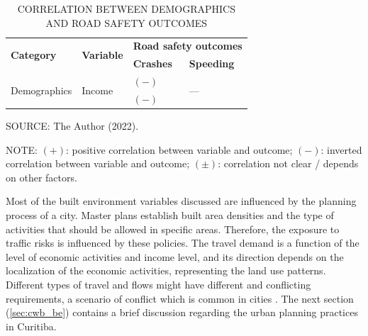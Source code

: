 \begin{table}[!hbtp]
    \footnotesize
    \captionsetup{justification=raggedright,
        singlelinecheck=false,
        font=footnotesize}
    \caption{CORRELATION BETWEEN DEMOGRAPHICS AND ROAD SAFETY OUTCOMES}
    \centering
    \begin{tabular}{llll}
        \hline
        \multirow{2}{*}{\textbf{Category}} & \multirow{2}{*}{\textbf{Variable}} & \multicolumn{2}{c}{\textbf{Road safety outcomes}} \\
         &  & \textbf{Crashes} & \textbf{Speeding} \\ \hline
        \multirow{2}{*}{Demographics} & \multirow{2}{*}{Income} & $(-)$ \textcite{Obelheiro2019} & \multirow{2}{*}{---} \\
         &  & $(-)$ \textcite{Marshall2017} &  \\ \hline
    \end{tabular}
    \label{tab:demographics}
    \par \vspace{2mm} \footnotesize \raggedright
    SOURCE: The Author (2022).
    \par \vspace{1mm} \footnotesize \raggedright
    NOTE: $(+)$: positive correlation between variable and outcome; $(-)$: inverted correlation between variable and outcome; $(\pm)$: correlation not clear / depends on other factors.
\end{table}








Most of the built environment variables discussed are influenced by the planning process of a city. Master plans establish built area densities and the type of activities that should be allowed in specific areas. Therefore, the exposure to traffic risks is influenced by these policies. The travel demand is a function of the level of economic activities and income level, and its direction depends on the localization of the economic activities, representing the land use patterns. Different types of travel and flows might have different and conflicting requirements, a scenario of conflict which is common in cities \cite{Tiwari}. The next section (\ref{sec:cwb_be}) contains a brief discussion regarding the urban planning practices in Curitiba.  

